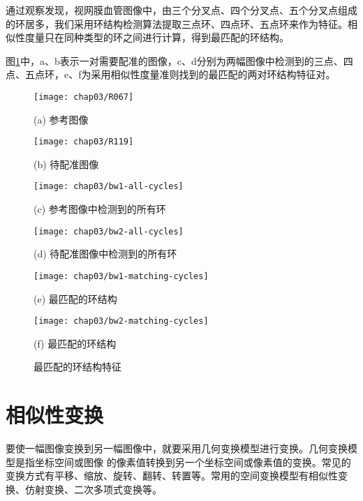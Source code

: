 通过观察发现，视网膜血管图像中，由三个分叉点、四个分叉点、五个分叉点组成的环居多，我们采用环结构检测算法提取三点环、四点环、五点环来作为特征。相似性度量只在同种类型的环之间进行计算，得到最匹配的环结构。

图\ref{fig:matching-pairs}中，a、b表示一对需要配准的图像，c、d分别为两幅图像中检测到的三点、四点、五点环，e、f为采用相似性度量准则找到的最匹配的两对环结构特征对。
\begin{figure}
\centering
\begin{minipage}[b]{0.48\textwidth} 
      \centering 
      \texttt{[image: chap03/R067]}
        \centerline{(a) 参考图像}\medskip
\end{minipage}
  \begin{minipage}[b]{0.48\textwidth}
    \centering
    \texttt{[image: chap03/R119]}
      \centerline{(b) 待配准图像}\medskip
  \end{minipage}
  \begin{minipage}[b]{0.48\textwidth}
    \centering
    \texttt{[image: chap03/bw1-all-cycles]}
      \centerline{(c) 参考图像中检测到的所有环}\medskip
  \end{minipage}
  \begin{minipage}[b]{0.48\textwidth}
    \centering
    \texttt{[image: chap03/bw2-all-cycles]}
      \centerline{(d) 待配准图像中检测到的所有环}\medskip
  \end{minipage}
 \begin{minipage}[b]{0.48\textwidth}
    \centering
      \texttt{[image: chap03/bw1-matching-cycles]}
        \centerline{(e) 最匹配的环结构}\medskip
    \end{minipage}
\begin{minipage}[b]{0.48\textwidth}
	\centering
      \texttt{[image: chap03/bw2-matching-cycles]}
        \centerline{(f) 最匹配的环结构}\medskip
    \end{minipage}
\caption{最匹配的环结构特征}
\label{fig:matching-pairs}
\end{figure}


\section{相似性变换}
\label{}

要使一幅图像变换到另一幅图像中，就要采用几何变换模型进行变换。几何变换模型是指坐标空间或图像 的像素值转换到另一个坐标空间或像素值的变换。常见的变换方式有平移、缩放、旋转、翻转、转置等。常用的空间变换模型有相似性变换、仿射变换、二次多项式变换等。

